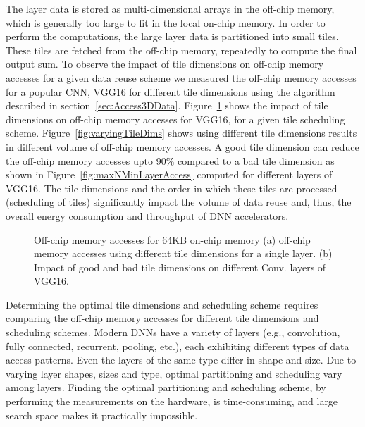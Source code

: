 The layer data is stored as multi-dimensional arrays in the off-chip memory, which is generally too large to fit in the local on-chip memory. In order to perform the computations, the large layer data is partitioned into small tiles.  These tiles are fetched from the off-chip memory, repeatedly to compute the final output sum. To observe the impact of tile dimensions on off-chip memory accesses for a given data reuse scheme we measured the off-chip memory accesses for a popular CNN, VGG16 for different tile dimensions using the algorithm described in section~\ref{sec:Access3DData}. Figure~\ref{fig:impactOfTileDims} shows the impact of tile dimensions on off-chip memory accesses for VGG16, for a given tile scheduling scheme. Figure~\ref{fig:varyingTileDims} shows using different tile dimensions results in different volume of off-chip memory accesses. A good tile dimension can reduce the off-chip memory accesses upto 90\% compared to a bad tile dimension as shown in Figure~\ref{fig:maxNMinLayerAccess} computed for different layers of VGG16. The tile dimensions and the order in which these tiles are processed (scheduling of tiles) significantly impact the volume of data reuse and, thus, the overall energy consumption and throughput of DNN accelerators.
\begin{figure}[!h]
	\centering
	\captionsetup{font=sf}
	\hfil	
	\hfil	
	\caption{Off-chip memory accesses for 64KB on-chip memory (a) off-chip memory accesses using different tile dimensions for a single layer. (b) Impact of good and bad tile dimensions on different Conv. layers of VGG16.}
	\label{fig:impactOfTileDims}
\end{figure}

Determining the optimal tile dimensions and scheduling scheme requires comparing the off-chip memory accesses for different tile dimensions and scheduling schemes. Modern DNNs have a variety of layers (e.g., convolution, fully connected, recurrent, pooling, etc.), each exhibiting different types of data access patterns. Even the layers of the same type differ in shape and size. Due to varying layer shapes, sizes and type, optimal partitioning and scheduling vary among layers. Finding the optimal partitioning and scheduling scheme, by performing the measurements on the hardware, is time-consuming, and large search space makes it practically impossible.

